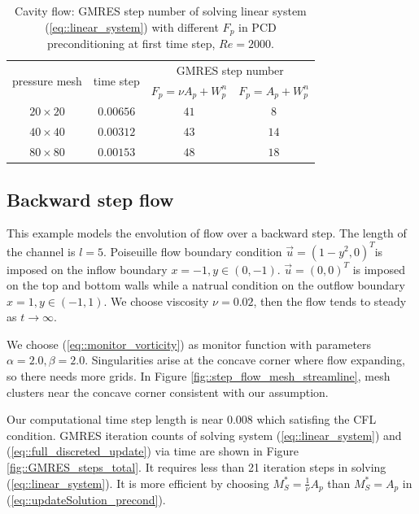 \documentclass{eajam}
\begin{document}
       \begin{table}[!htbp]
         \centering
         \begin{tabular}{cccc}
           \toprule
           \multirow{2}{*}{pressure mesh}    & \multirow{2}{*}{time
             step} & \multicolumn{2}{c}{GMRES step number} \\
           \cline{3-4}
            &               & $F_p = \nu A_p + W_p^n$ & $F_p = A_p + W_p^n$ \\ \midrule
           $20 \times 20$   &   $0.00656$         &      $41$           &     $8$
           \\ \midrule
           $40 \times 40$   &   $0.00312$         &      $43$           &     $14$
           \\ \midrule       
           $80 \times 80$   &   $0.00153$   &      $48$    &     $18$
           \\ \bottomrule 
         \end{tabular}
         \caption{Cavity flow: GMRES step number of solving linear system
           (\ref{eq::linear_system}) with different $F_p$ in PCD
           preconditioning at first time step, $Re = 2000$.}
         \label{tab::GMRES_steps_initial}
       \end{table}
   \subsection{Backward step flow}

      This example models the envolution of flow over a backward step.
      The length of the channel is $l = 5$. Poiseuille flow boundary
      condition $\vec{u} = (1 - y^2, 0)^T$is imposed on the inflow
      boundary $x = -1, y \in (0, -1)$. $\vec{u} = (0, 0)^T$ is imposed
      on the top and bottom walls while a natrual condition on the
      outflow boundary $x = 1, y \in (-1, 1)$. We choose viscosity
      $\nu = 0.02$, then the flow tends to steady as $t \rightarrow
      \infty$.
      
      We choose (\ref{eq::monitor_vorticity}) as monitor function
      with parameters $\alpha = 2.0, \beta = 2.0$. Singularities arise
      at the concave corner where flow expanding, so there needs more
      grids. In Figure \ref{fig::step_flow_mesh_streamline}, mesh
      clusters near the concave corner consistent with our assumption. 
      
      Our computational time step length is near $0.008$ which
      satisfing the CFL condition. GMRES iteration counts of solving
      system (\ref{eq::linear_system}) and
      (\ref{eq::full_discreted_update}) via time are shown in
      Figure \ref{fig::GMRES_steps_total}. It requires less than 21
      iteration steps in solving (\ref{eq::linear_system}). 
      It is more efficient by choosing $M_S^* = \frac{1}{\nu} A_p$
      than $M_S^* = A_p$ in (\ref{eq::updateSolution_precond}).
 
\end{document}
